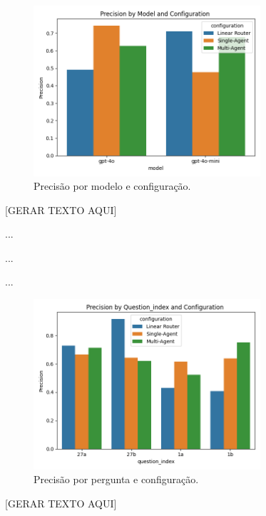             \begin{figure}[h!]
                \centering              
                \includegraphics[width=0.75\textwidth]{images_part_2/model_precision_model_configuration.png}
                \caption{Precisão por modelo e configuração.}
                \label{fig:aaaa}
            \end{figure}
            
            [GERAR TEXTO AQUI]

            ...

            ...

            ...

            \begin{figure}[h!]
                \centering              
                \includegraphics[width=0.75\textwidth]{images_part_2/question_precision_question_index_configuration.png}
                \caption{Precisão por pergunta e configuração.}
                \label{fig:aaaa}
            \end{figure}    

            [GERAR TEXTO AQUI]

